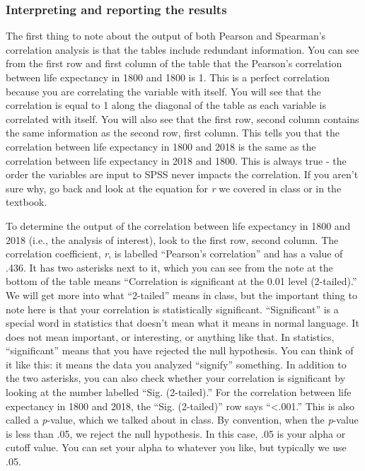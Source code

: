 \documentclass[
]{book}
\begin{document}
\hypertarget{interpreting-and-reporting-the-results}{%
\subsubsection{Interpreting and reporting the results}\label{interpreting-and-reporting-the-results}}

The first thing to note about the output of both Pearson and Spearman's correlation analysis is that the tables include redundant information. You can see from the first row and first column of the table that the Pearson's correlation between life expectancy in 1800 and 1800 is 1. This is a perfect correlation because you are correlating the variable with itself. You will see that the correlation is equal to 1 along the diagonal of the table as each variable is correlated with itself. You will also see that the first row, second column contains the same information as the second row, first column. This tells you that the correlation between life expectancy in 1800 and 2018 is the same as the correlation between life expectancy in 2018 and 1800. This is always true - the order the variables are input to SPSS never impacts the correlation. If you aren't sure why, go back and look at the equation for \emph{r} we covered in class or in the textbook.

To determine the output of the correlation between life expectancy in 1800 and 2018 (i.e., the analysis of interest), look to the first row, second column. The correlation coefficient, \emph{r}, is labelled ``Pearson's correlation'' and has a value of .436. It has two asterisks next to it, which you can see from the note at the bottom of the table means ``Correlation is significant at the 0.01 level (2-tailed).'' We will get more into what ``2-tailed'' means in class, but the important thing to note here is that your correlation is statistically significant. ``Significant'' is a special word in statistics that doesn't mean what it means in normal language. It does not mean important, or interesting, or anything like that. In statistics, ``significant'' means that you have rejected the null hypothesis. You can think of it like this: it means the data you analyzed ``signify'' something.
In addition to the two asterisks, you can also check whether your correlation is significant by looking at the number labelled ``Sig. (2-tailed).'' For the correlation between life expectancy in 1800 and 2018, the ``Sig. (2-tailed)'' row says ``\textless.001.'' This is also called a \emph{p}-value, which we talked about in class. By convention, when the \emph{p}-value is less than .05, we reject the null hypothesis. In this case, .05 is your alpha or cutoff value. You can set your alpha to whatever you like, but typically we use .05.
\end{document}
